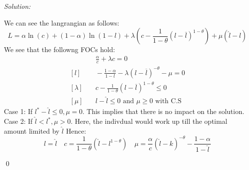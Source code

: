 \documentclass[12pt]{article}
\newenvironment{subsol}
    {\emph{Solution:}
    }
    {
    \qed
    }
\begin{document}
\begin{subsol}
    We can see the langrangian as follows:
    \[
    L = \alpha \ln(c) + (1-\alpha) \ln(1-l) + \lambda \left(c - \frac{1}{1-\theta}(l - \overline{l})^{1-\theta}\right) + \mu (\hat{l} - l)
    \]
    We see that the followng FOCs hold:
    \begin{align*}
        [c] & \quad \frac{\alpha}{c} + \lambda c = 0\\
        [l] & \quad -\frac{1-\alpha}{1-l} - \lambda (l -\overline{l})^{-\theta} - \mu = 0\\
        [\lambda] & \quad c - \frac{1}{1-\theta}(l - \overline{l})^{1-\theta} \leq 0 \\
        [\mu] & \quad l - \hat{l} \leq 0 \text{ and } \mu \geq 0 \text{ with C.S}
    \end{align*}
    Case 1: If $l^* - \hat{l} \leq 0, \mu = 0$. This implies that there is no impact on the solution. \\
    Case 2: If $\hat{l} < l^*, \mu > 0$. Here, the indivdual would work up till the optimal amount limited by $\hat{l}$ Hence:
    \[
    l = \hat{l} \quad c = \frac{1}{1-\theta} (\hat{l} - l   ^{1-\theta}) \quad \mu = \frac{\alpha}{c} (\hat{l} - k )^{-\theta} - \frac{1-\alpha}{1-\hat{l}}
    \] 
\end{subsol}

\end{document}
